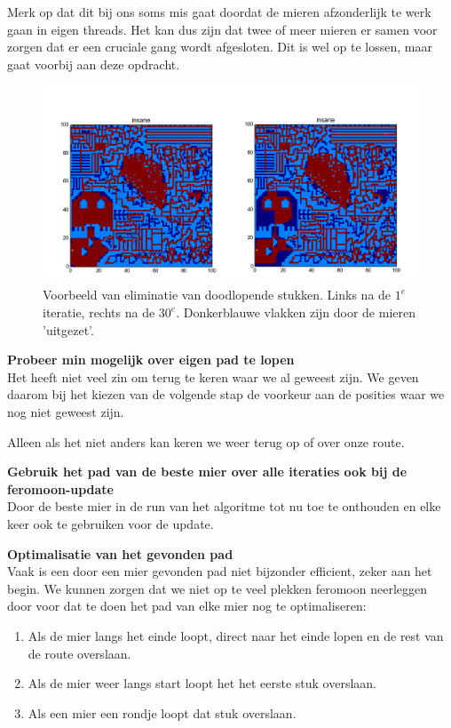 \documentclass[a4paper,10pt,fleqn]{article}
\begin{document}
\begin{enumerate}[1.]
\begin{description}
            Merk op dat dit bij ons soms mis gaat doordat de mieren afzonderlijk te werk gaan in eigen threads. Het kan dus zijn dat twee of meer mieren er samen voor zorgen dat er een cruciale gang wordt afgesloten. Dit is wel op te lossen, maar gaat voorbij aan deze opdracht.

        \end{description}

        \begin{figure}[!ht]
            \centering
            \includegraphics[width=\textwidth]{images/maze-elimination.png}
            \caption{Voorbeeld van eliminatie van doodlopende stukken. Links na de $1^e$ iteratie, rechts na de $30^e$. Donkerblauwe vlakken zijn door de mieren 'uitgezet'.}
        \end{figure}

        \textbf{Probeer min mogelijk over eigen pad te lopen} \\
        Het heeft niet veel zin om terug te keren waar we al geweest zijn. We geven daarom bij het kiezen van de volgende stap de voorkeur aan de posities waar we nog niet geweest zijn.

        Alleen als het niet anders kan keren we weer terug op of over onze route.

        \textbf{Gebruik het pad van de beste mier over alle iteraties ook bij de feromoon-update} \\
        Door de beste mier in de run van het algoritme tot nu toe te onthouden en elke keer ook te gebruiken voor de update.


        \textbf{Optimalisatie van het gevonden pad} \\
        Vaak is een door een mier gevonden pad niet bijzonder efficient, zeker aan het begin. We kunnen zorgen dat we niet op te veel plekken feromoon neerleggen door voor dat te doen het pad van elke mier nog te optimaliseren:
            \begin{enumerate}[-]
                \item Als de mier langs het einde loopt, direct naar het einde lopen en de rest van de route overslaan.
                \item Als de mier weer langs start loopt het het eerste stuk overslaan.
                \item Als een mier een rondje loopt dat stuk overslaan.
            \end{enumerate}


\end{enumerate}
\end{document}
